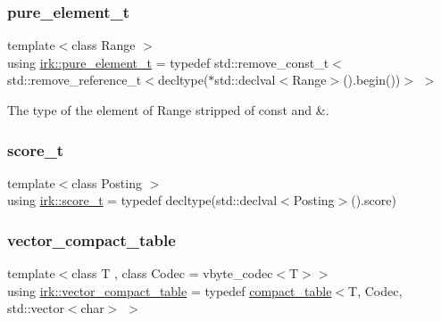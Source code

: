 \mbox{\label{namespaceirk_a1e48b43a3f40d553264380da5e7263c1}} 
\subsubsection{\texorpdfstring{pure\+\_\+element\+\_\+t}{pure\_element\_t}}
{\footnotesize\ttfamily template$<$class Range $>$ \\
using \mbox{\hyperlink{namespaceirk_a1e48b43a3f40d553264380da5e7263c1}{irk\+::pure\+\_\+element\+\_\+t}} = typedef std\+::remove\+\_\+const\+\_\+t$<$ std\+::remove\+\_\+reference\+\_\+t$<$decltype($\ast$std\+::declval$<$Range$>$().begin())$>$ $>$}



The type of the element of Range stripped of {\ttfamily const} and {\ttfamily \&}. 

\mbox{\label{namespaceirk_a87bce44d1e3fdff0b1b3bb78f2a5f924}} 
\subsubsection{\texorpdfstring{score\+\_\+t}{score\_t}}
{\footnotesize\ttfamily template$<$class Posting $>$ \\
using \mbox{\hyperlink{namespaceirk_a87bce44d1e3fdff0b1b3bb78f2a5f924}{irk\+::score\+\_\+t}} = typedef decltype(std\+::declval$<$Posting$>$().score)}

\mbox{\label{namespaceirk_a34b2e9b780a3b5d4532d7975d6c1a8bf}} 
\subsubsection{\texorpdfstring{vector\+\_\+compact\+\_\+table}{vector\_compact\_table}}
{\footnotesize\ttfamily template$<$class T , class Codec  = vbyte\+\_\+codec$<$\+T$>$$>$ \\
using \mbox{\hyperlink{namespaceirk_a34b2e9b780a3b5d4532d7975d6c1a8bf}{irk\+::vector\+\_\+compact\+\_\+table}} = typedef \mbox{\hyperlink{classirk_1_1compact__table}{compact\+\_\+table}}$<$T, Codec, std\+::vector$<$char$>$ $>$}

